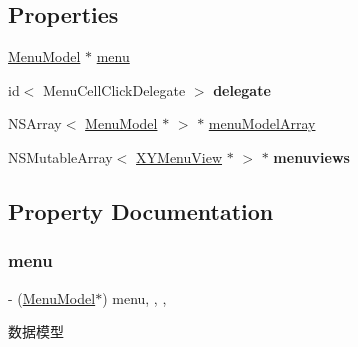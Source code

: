 \subsection*{Properties}
\begin{DoxyCompactItemize}
\item 
\mbox{\hyperlink{interface_menu_model}{Menu\+Model}} $\ast$ \mbox{\hyperlink{interface_x_y_quick_menu_view_a1caef68eb57597ec57b4a4b5bdc58d02}{menu}}
\item 
\mbox{\label{interface_x_y_quick_menu_view_a1f367adacfecb9bf3b620798dcdb2a30}} 
id$<$ Menu\+Cell\+Click\+Delegate $>$ {\bfseries delegate}
\item 
N\+S\+Array$<$ \mbox{\hyperlink{interface_menu_model}{Menu\+Model}} $\ast$ $>$ $\ast$ \mbox{\hyperlink{interface_x_y_quick_menu_view_a92d73377e1c20e716f6e9dc62ff10ca1}{menu\+Model\+Array}}
\item 
\mbox{\label{interface_x_y_quick_menu_view_aec3a02c1ef90a7a4cd5ecd52d055a525}} 
N\+S\+Mutable\+Array$<$ \mbox{\hyperlink{interface_x_y_menu_view}{X\+Y\+Menu\+View}} $\ast$ $>$ $\ast$ {\bfseries menuviews}
\end{DoxyCompactItemize}


\subsection{Property Documentation}
\mbox{\label{interface_x_y_quick_menu_view_a1caef68eb57597ec57b4a4b5bdc58d02}} 
\subsubsection{\texorpdfstring{menu}{menu}}
{\footnotesize\ttfamily -\/ (\mbox{\hyperlink{interface_menu_model}{Menu\+Model}}$\ast$) menu\hspace{0.3cm}{\ttfamily [read]}, {\ttfamily [write]}, {\ttfamily [nonatomic]}, {\ttfamily [strong]}}

数据模型 \mbox{\label{interface_x_y_quick_menu_view_a92d73377e1c20e716f6e9dc62ff10ca1}} 
